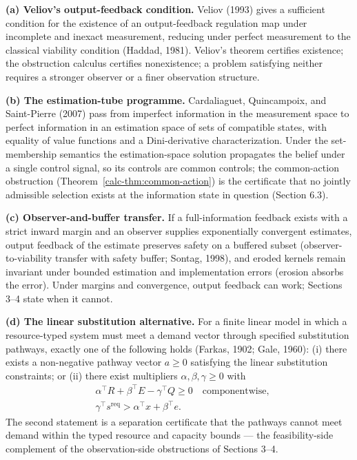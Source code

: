 \documentclass[10pt,twocolumn]{article}
\theoremstyle{definition}
\begin{document}
\textbf{(a) Veliov's output-feedback condition.} Veliov (1993) gives a sufficient condition for the existence of an output-feedback regulation map under incomplete and inexact measurement, reducing under perfect measurement to the classical viability condition (Haddad, 1981). Veliov's theorem certifies existence; the obstruction calculus certifies nonexistence; a problem satisfying neither requires a stronger observer or a finer observation structure.

\textbf{(b) The estimation-tube programme.} Cardaliaguet, Quincampoix, and Saint-Pierre (2007) pass from imperfect information in the measurement space to perfect information in an estimation space of sets of compatible states, with equality of value functions and a Dini-derivative characterization. Under the set-membership semantics the estimation-space solution propagates the belief under a single control signal, so its controls are common controls; the common-action obstruction (Theorem~\ref{calc-thm:common-action}) is the certificate that no jointly admissible selection exists at the information state in question (Section 6.3).

\textbf{(c) Observer-and-buffer transfer.} If a full-information feedback exists with a strict inward margin and an observer supplies exponentially convergent estimates, output feedback of the estimate preserves safety on a buffered subset (observer-to-viability transfer with safety buffer; Sontag, 1998), and eroded kernels remain invariant under bounded estimation and implementation errors (erosion absorbs the error). Under margins and convergence, output feedback can work; Sections 3--4 state when it cannot.

\textbf{(d) The linear substitution alternative.} For a finite linear model in which a resource-typed system must meet a demand vector through specified substitution pathways, exactly one of the following holds (Farkas, 1902; Gale, 1960): (i) there exists a non-negative pathway vector \(a \ge 0\) satisfying the linear substitution constraints; or (ii) there exist multipliers \(\alpha, \beta, \gamma \ge 0\) with
\[
\begin{aligned}
&\alpha^\top R + \beta^\top E - \gamma^\top Q \ge 0 \quad\text{componentwise},\\
&\gamma^\top s^{\mathrm{req}} > \alpha^\top x + \beta^\top e.
\end{aligned}
\]
The second statement is a separation certificate that the pathways cannot meet demand within the typed resource and capacity bounds --- the feasibility-side complement of the observation-side obstructions of Sections 3--4.
\end{document}
